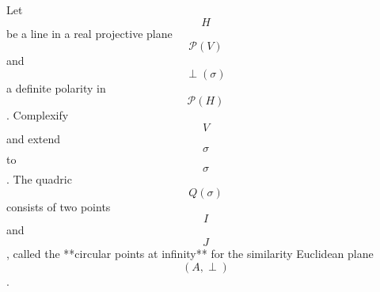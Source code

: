 Let $$H$$ be a line in a real projective plane $$\mathcal{P}(V)$$ and $$\perp(\sigma)$$ a definite polarity in $$\mathcal{P}(H)$$. Complexify $$V$$ and extend $$\sigma$$ to $$\sigma$$. The quadric $$Q(\sigma)$$ consists of two points $$I$$ and $$J$$, called the **circular points at infinity** for the similarity Euclidean plane $$(A, \perp)$$.
